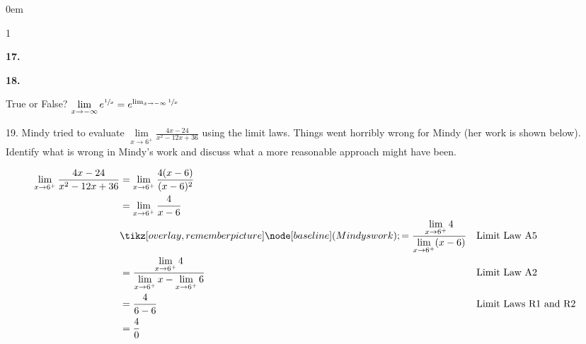 \documentclass[12pt,]{book}
\theoremstyle{plain}
\theoremstyle{definition}
\numberwithin{equation}{section}
\newenvironment{exercisegroup}%
{\medskip\noindent}%
{\par\bigskip}%
\newlength{\exercisegroupindent}%
\newlength{\exercisegroupitemwidth}%
\newenvironment{exercisegrouplist}%
{\vspace{-\partopsep}%
\begin{adjustwidth}{\exercisegroupindent}{0em}}%
{\end{adjustwidth}%
\vspace{-\partopsep}%
\vspace{\baselineskip}}%
\newenvironment{exercisegroupbycol}[1]%
{\begin{exercisegrouplist}%
\vspace{-\multicolsep}%
\begin{multicols}{#1}%
\setlength{\parindent}{0em}%
\setlength{\exercisegroupitemwidth}{\linewidth}}%
{\end{multicols}%
\vspace{-\multicolsep}%
\end{exercisegrouplist}}%
\newenvironment{exercisegroupitem}[1]%
{\begin{minipage}[t]{\exercisegroupitemwidth}
\vspace{0pt}%
{\bfseries#1}%
\rule{0pt}{\baselineskip}}{\strut%
\end{minipage}%
\hspace{\columnsep}}%
\providecommand\phantomsection{}
\newcommand{\tikzmark}[1]{\tikz[overlay,remember picture] \node[baseline] (#1) {};}%
\begin{document}
\begin{exerciselist}
\begin{exercisegroup}
\begin{exercisegroupbycol}{1}
\begin{exercisegroupitem}{17. }
\end{exercisegroupitem}%
\par%
\begin{exercisegroupitem}{18. }\phantomsection\hypertarget{exercise-hear-me-last}{\null}
True or False? \(\lim\limits_{x\to-\infty}e^{\sfrac{1}{x}}=e^{\lim_{x\to-\infty}\sfrac{1}{x}}\)%
\end{exercisegroupitem}%
\par%
\end{exercisegroupbycol}%
\end{exercisegroup}%
\item[19.]\phantomsection\hypertarget{exercise-108}{\null}Mindy tried to evaluate \(\lim\limits_{x\to6^{+}}\frac{4x-24}{x^2-12x+36}\) using the limit laws. Things went horribly wrong for Mindy (her work is shown below). Identify what is wrong in Mindy's work and discuss what a more reasonable approach might have been.%
\par
\begin{align*}
\lim_{x\to6^{+}}\frac{4x-24}{x^2-12x+36}&=\lim_{x\to6^{+}}\frac{4(x-6)}{(x-6)^2}\\
&=\lim_{x\to6^{+}}\frac{4}{x-6}\\
&\tikzmark{Mindys work}=\frac{\lim\limits_{x\to6^{+}}4}{\lim\limits_{x\to6^{+}}(x-6)}&&\text{Limit Law A5}\\
&=\frac{\lim\limits_{x\to6^{+}}4}{\lim\limits_{x\to6^{+}}x-\lim\limits_{x\to6^{+}}6}&&\text{Limit Law A2}\\
&=\frac{4}{6-6}&&\text{Limit Laws R1 and R2}\\
&=\frac{4}{0}
\end{align*}%
\par\smallskip
\end{exerciselist}
\typeout{************************************************}
\typeout{************************************************}
\end{document}

